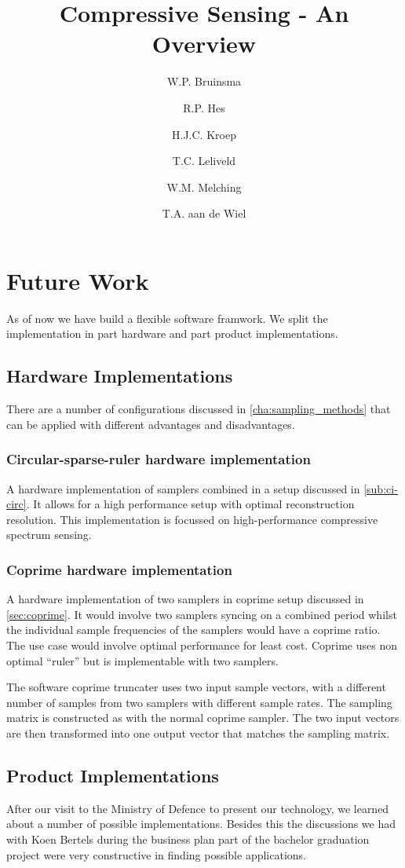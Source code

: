 \documentclass[a4paper, openany, oneside]{memoir}
\title{Compressive Sensing - An Overview}
\author{W.P. Bruinsma \and R.P. Hes \and H.J.C. Kroep \and T.C. Leliveld \and W.M. Melching \and T.A. aan de Wiel}
\begin{document}
\chapter{Future Work}
\label{cha:futurework}
As of now we have build a flexible software framwork. We split the implementation in part hardware and part product implementations.

\section{Hardware Implementations}
\label{sec:hardware_implementations}
There are a number of configurations discussed in \cref{cha:sampling_methods} that can be applied with different advantages and disadvantages.

\subsection{Circular-sparse-ruler hardware implementation}
\label{sub:minimal_sparse_ruler_hardware_implementation}
A hardware implementation of samplers combined in a setup discussed in \cref{sub:ci-circ}. It allows for a high performance setup with optimal reconstruction resolution. This implementation is focussed on high-performance compressive spectrum sensing.

\subsection{Coprime hardware implementation}
\label{sub:coprime_hardwa}
A hardware implementation of two samplers in coprime setup discussed in \cref{sec:coprime}. It would involve two samplers syncing on a combined period whilst the individual sample frequencies of the samplers would have a coprime ratio. The use case would involve optimal performance for least cost. Coprime uses non optimal ``ruler'' but is implementable with two samplers.

The software coprime truncater uses two input sample vectors, with a different number of samples from two samplers with different sample rates. The sampling matrix is constructed as with the normal coprime sampler. The two input vectors are then transformed into one output vector that matches the sampling matrix.

\section{Product Implementations}
\label{sec:product_implementations}
After our visit to the Ministry of Defence to present our technology, we learned about a number of possible implementations. Besides this the discussions we had with Koen Bertels during the business plan part of the bachelor graduation project were very constructive in finding possible applications.
\end{document}
